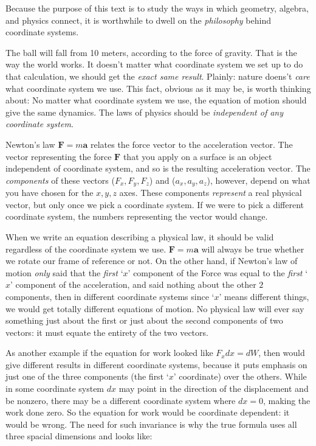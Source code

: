 \documentclass[../master.tex]{subfiles}
\begin{document}
	Because the purpose of this text is to study the ways in which geometry, algebra, and physics connect, it is worthwhile to dwell on the \emph{philosophy} behind coordinate systems.
	
	The ball will fall from 10 meters, according to the force of gravity. That is the way the world works. It doesn't matter what coordinate system we set up to do that calculation, we should get the \emph{exact same result}. Plainly: nature doens't \emph{care} what coordinate system we use. This fact, obvious as it may be, is worth thinking about: No matter what coordinate system we use, the equation of motion should give the same dynamics. The laws of physics should be \emph{independent of any coordinate system}.
	
	Newton's law $\mathbf F = m \mathbf a$ relates the force vector to the acceleration vector. The vector representing the force $\mathbf F$ that you apply on a surface is an object independent of coordinate system, and so is the resulting acceleration vector. The \emph{components} of these vectors ($F_x, F_y, F_z$) and ($a_x, a_y, a_z$), however, depend on what you have chosen for the $x,y,z$ axes. These components \emph{represent} a real physical vector, but only once we pick a coordinate system. If we were to pick a different coordinate system, the numbers representing the vector would change. 
	
	When we write an equation describing a physical law, it should be valid regardless of the coordinate system we use. $\mathbf F = m \mathbf a$ will always be true whether we rotate our frame of reference or not. On the other hand, if Newton's law of motion \emph{only} said that the \emph{first} `$x$' component of the Force was equal to the \emph{first} `$x$' component of the acceleration, and said nothing about the other $2$ components, then in different coordinate systems since `$x$' means different things, we would get totally different equations of motion. No physical law will ever say something just about the first or just about the second components of two vectors: it must equate the entirety of the two vectors. 
	
	
	As another example if the equation for work looked like $F_x dx = dW$, then would give different results in different coordinate systems, because it puts emphasis on just one of the three components (the first `$x$' coordinate) over the others. While in some coordinate system $dx$ may point in the direction of the displacement and be nonzero, there may be a different coordinate system where $dx=0$, making the work done zero. So the equation for work would be coordinate dependent: it would be wrong. The need for such invariance is why the true formula uses all three spacial dimensions and looks like:
	
\end{document}
